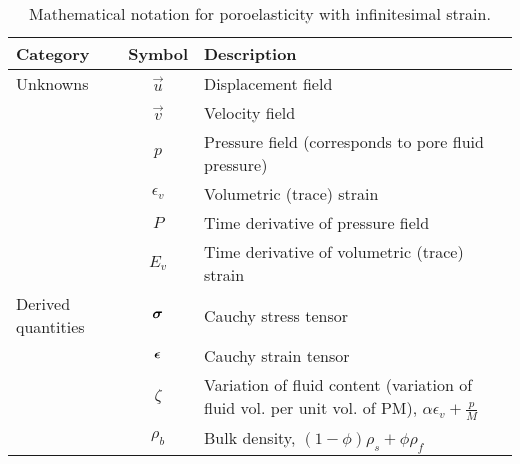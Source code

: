 \begin{table}[htbp]
  \caption{Mathematical notation for poroelasticity with
    infinitesimal strain.}
  \label{tab:notation:poroelasticity}
  \begin{tabular}{lcp{3.5in}}
    \toprule
    {\bf Category}                 & {\bf Symbol}        & {\bf Description}                                                                                             \\
    \midrule
    Unknowns                       & $\vec{u}$           & Displacement field                                                                                            \\
                                   & $\vec{v}$           & Velocity field                                                                                                \\
                                   & $p$                 & Pressure field (corresponds to pore fluid pressure)                                                           \\
                                   & $\epsilon_{v}$      & Volumetric (trace) strain                                                                                     \\
                                   & $P$                 & Time derivative of pressure field                                                                             \\
                                   & $E_{v}$             & Time derivative of volumetric (trace) strain                                                                  \\
    \hline
    Derived quantities             & $\bm{\sigma}$   & Cauchy stress tensor                                                                                          \\
                                   & $\bm{\epsilon}$ & Cauchy strain tensor                                                                                          \\
                                   & $\zeta$             & Variation of fluid content (variation of fluid vol. per unit vol. of PM), $\alpha \epsilon_{v} + \frac{p}{M}$ \\
                                   & $\rho_{b}$          & Bulk density, $\left(1 - \phi\right) \rho_{s} + \phi \rho_{f}$                                                \\

\end{tabular}
\end{table}
